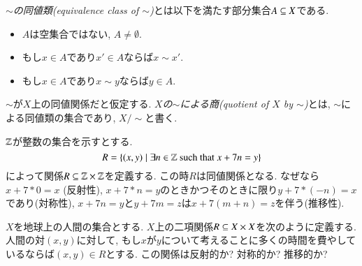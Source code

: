 \begin{definition}
\emph{$\sim$の同値類(equivalence class of $\sim$)}とは以下を満たす部分集合$A\ss X$である.
\begin{itemize}
\item $A$は空集合ではない, $A\neq\emptyset$.
\item もし$x\in A$であり$x'\in A$ならば$x\sim x'$. 
\item もし$x\in A$であり$x\sim y$ならば$y\in A$.
\end{itemize}
$\sim$が$X$上の同値関係だと仮定する. \emph{$X$の$\sim$による商(quotient of $X$ by $\sim$)}とは, $\sim$による同値類の集合であり, $X/\sim$と書く.

\end{definition}

\begin{example}


$\ZZ$が整数の集合を示すとする. $$R=\{(x,y)\|\exists n\in\ZZ \tn{ such that } x+7n=y\}$$によって関係$R\ss\ZZ\times\ZZ$を定義する. この時$R$は同値関係となる. なぜなら$x+7*0=x$ (反射性), $x+7*n=y$のときかつそのときに限り$y+7*(-n)= x$であり(対称性), $x+7n=y$と$y+7m=z$は$x+7(m+n)=z$を伴う(推移性).

\end{example}

\begin{exercise}
$X$を地球上の人間の集合とする. $X$上の二項関係$R\ss X\times X$を次のように定義する. 人間の対$(x,y)$に対して, もし$x$が$y$について考えることに多くの時間を費やしているならば$(x,y)\in R$とする.
\sexc この関係は反射的か? 
\next 対称的か?
\next 推移的か?
\endsexc
\end{exercise}

